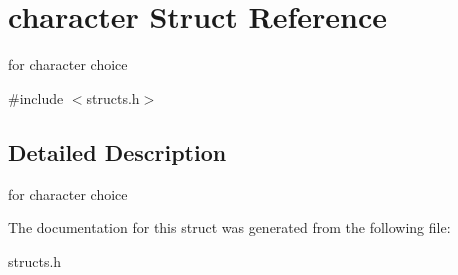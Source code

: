 \hypertarget{structcharacter}{}\section{character Struct Reference}
\label{structcharacter}


for character choice  




{\ttfamily \#include $<$structs.\+h$>$}



\subsection{Detailed Description}
for character choice 

The documentation for this struct was generated from the following file\+:\begin{DoxyCompactItemize}
\item 
structs.\+h\end{DoxyCompactItemize}
